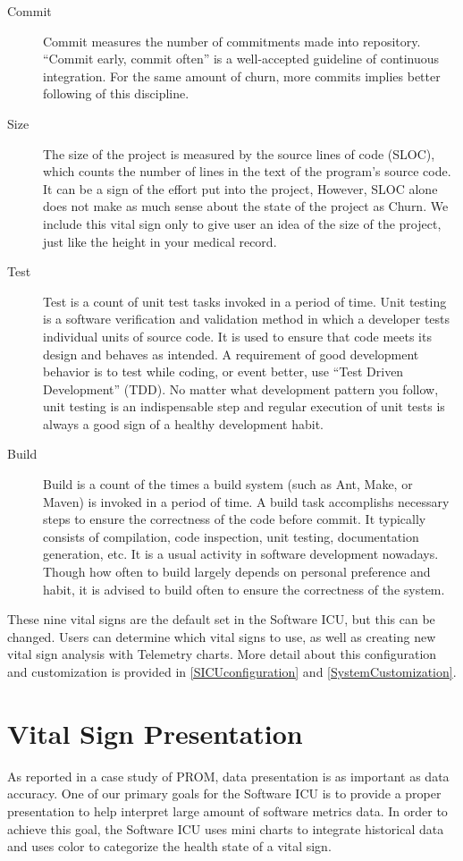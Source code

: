 \begin{description}
\item[Commit] 
Commit measures the number of commitments made into repository. ``Commit early, commit often'' is a well-accepted guideline of continuous integration. For the same amount of churn, more commits implies better following of this discipline.

\item[Size] 
The size of the project is measured by the source lines of code (SLOC), which counts the number of lines in the text of the program's source code. It can be a sign of the effort put into the project, However, SLOC alone does not make as much sense about the state of the project as Churn. We include this vital sign only to give user an idea of the size of the project, just like the height in your medical record.

\item[Test] 
Test is a count of unit test tasks invoked in a period of time. Unit testing is a software verification and validation method in which a developer tests individual units of source code. It is used to ensure that code meets its design and behaves as intended. A requirement of good development behavior is to test while coding, or event better, use ``Test Driven Development'' (TDD). No matter what development pattern you follow, unit testing is an indispensable step and regular execution of unit tests is always a good sign of a healthy development habit.

\item[Build] 
Build is a count of the times a build system (such as Ant, Make, or Maven) is invoked in a period of time. A build task accomplishs necessary steps to ensure the correctness of the code before commit. It typically consists of compilation, code inspection, unit testing, documentation generation, etc. It is a usual activity in software development nowadays. Though how often to build largely depends on personal preference and habit, it is advised to build often to ensure the correctness of the system.

\end{description}

These nine vital signs are the default set in the Software ICU, but this can be changed. Users can determine which vital signs to use, as well as creating new vital sign analysis with Telemetry charts. More detail about this configuration and customization is provided in \autoref{SICUconfiguration} and \autoref{SystemCustomization}.

\section{Vital Sign Presentation}
\label{presentation}
As reported in a case study of PROM, data presentation is as important as data accuracy\cite{prom09}. One of our primary goals for the Software ICU is to provide a proper presentation to help interpret large amount of software metrics data. In order to achieve this goal, the Software ICU uses mini charts to integrate historical data and uses color to categorize the health state of a vital sign.

